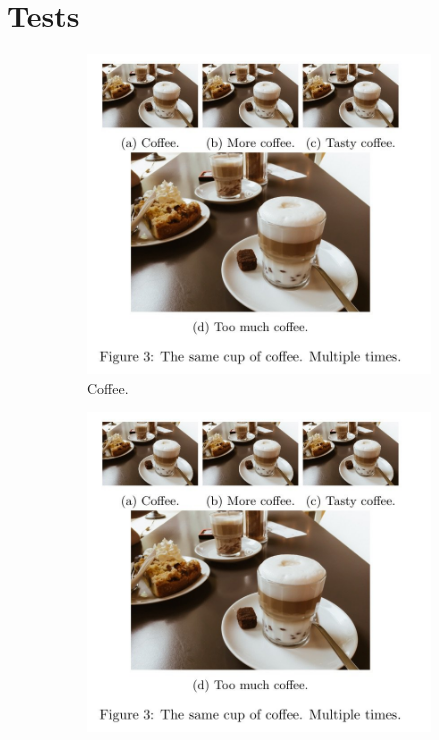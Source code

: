 \documentclass{article}
\begin{document}
\section{Tests}
\begin{figure}[h!]
  \centering
  \begin{subfigure}[b]{0.2\linewidth}
    \includegraphics[width=\linewidth]{coffee.jpg}
     \caption{Coffee.}
  \end{subfigure}
  \begin{subfigure}[b]{0.2\linewidth}
    \includegraphics[width=\linewidth]{coffee.jpg}

\end{subfigure}
\end{figure}
\end{document}
